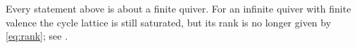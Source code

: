 \begin{remark}\label{sh-000F}
Every statement above is about a finite quiver. For an infinite quiver with finite valence the cycle lattice is still saturated, but its rank is no longer given by \eqref{eq:rank}; see \cite{Cortez07}.
\end{remark}